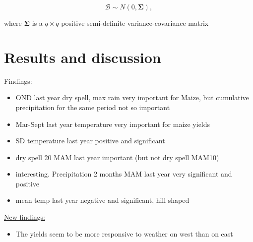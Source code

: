 \documentclass[a4paper,12pt]{article}
\begin{document}
\begin{equation}\label{ranefDist}
\mathscr{B} \sim \mathit{N}(0,\mathbf{\Sigma}),
\end{equation}

where $\mathbf{\Sigma}$ is a $q \times q$ positive semi-definite variance-covariance matrix

\FloatBarrier
	\section{Results and discussion}\label{Results}



\large Findings:
\begin{itemize}
\item OND last year dry spell, max rain very important for Maize, but cumulative precipitation for the same period not so important

\item Mar-Sept last year temperature very important for maize yields
\item SD temperature last year positive and significant
\item dry spell 20 MAM last year important (but not dry spell MAM10)
\item interesting. Precipitation 2 months MAM last year very significant and positive
\item mean temp last year negative and significant, hill shaped 
\end{itemize}

\underline{New findings:}

\begin{itemize}
\item The yields seem to be more responsive to weather on west than on east
\end{itemize}
\normalsize
\FloatBarrier
\pagebreak
\end{document}
